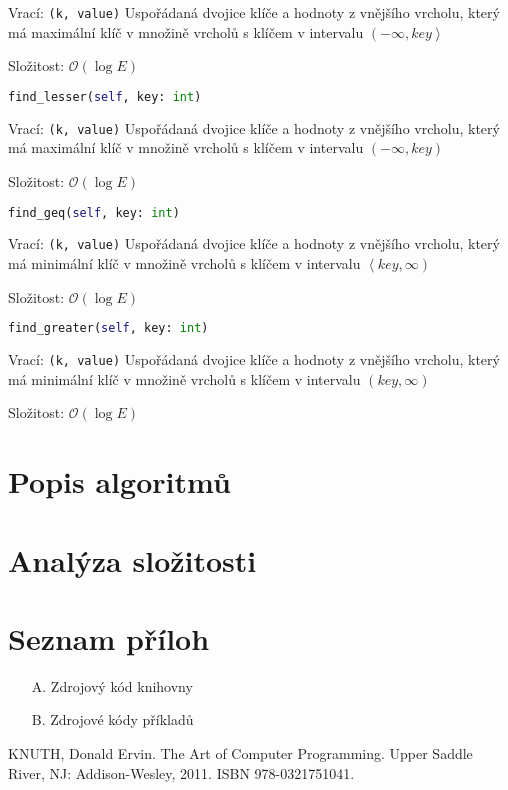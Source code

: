 \documentclass[a4paper,11pt,openany]{article}
\begin{document}
Vrací: \texttt{(k, value)} Uspořádaná dvojice klíče a hodnoty z vnějšího vrcholu, který má maximální klíč v množině vrcholů s klíčem v intervalu $\left( -\infty, key\right\rangle $

Složitost: $\mathcal{O}(\log E)$

\begin{lstlisting}[language=python,frame=none]
find_lesser(self, key: int)
\end{lstlisting}

Vrací: \texttt{(k, value)} Uspořádaná dvojice klíče a hodnoty z vnějšího vrcholu, který má maximální klíč v množině vrcholů s klíčem v intervalu $\left( -\infty, key\right) $

Složitost: $\mathcal{O}(\log E)$

\begin{lstlisting}[language=python,frame=none]
find_geq(self, key: int)
\end{lstlisting}

Vrací: \texttt{(k, value)} Uspořádaná dvojice klíče a hodnoty z vnějšího vrcholu, který má minimální klíč v množině vrcholů s klíčem v intervalu $\left\langle key, \infty \right) $

Složitost: $\mathcal{O}(\log E)$

\begin{lstlisting}[language=python,frame=none]
find_greater(self, key: int)
\end{lstlisting}

Vrací: \texttt{(k, value)} Uspořádaná dvojice klíče a hodnoty z vnějšího vrcholu, který má minimální klíč v množině vrcholů s klíčem v intervalu $\left( key, \infty \right) $

Složitost: $\mathcal{O}(\log E)$

\section{Popis algoritmů}

\lipsum[10]

\lipsum[10]

\section{Analýza složitosti}

\lipsum[10]

\lipsum[10]

\listoffigures
\listoftables
\section*{Seznam příloh}
\begin{enumerate}
	\item[A.] Zdrojový kód knihovny
	\item[B.] Zdrojové kódy příkladů
\end{enumerate}
\begin{thebibliography}{10}
	KNUTH, Donald Ervin. The Art of Computer Programming. Upper Saddle River, NJ: Addison-Wesley, 2011. ISBN 978-0321751041.
\end{thebibliography}
\end{document}
